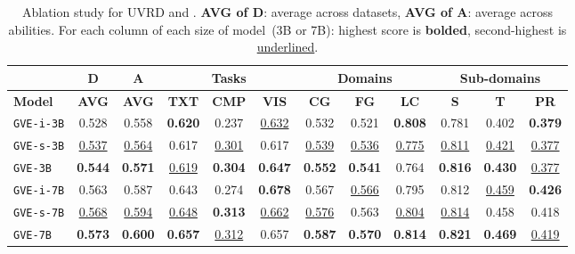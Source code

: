 \begin{table}[t]
\centering
\caption{Ablation study for UVRD and \pyramid. \colorbox{gray!15}{\textbf{AVG of D}}: average across datasets, \colorbox{gray!40}{\textbf{AVG of A}}: average across abilities. For each column of each size of model~(3B or 7B): highest score is \textbf{bolded}, second-highest is \underline{underlined}.}
\label{gve:tab:ablation}
\setlength{\tabcolsep}{2pt}
\begin{tabularx}{\linewidth}{X|>{\columncolor{gray!15}}c|>{\columncolor{gray!40}}c|ccc|ccc|ccc}
\toprule
& \textbf{D} & \textbf{A} & \multicolumn{3}{c|}{\textbf{Tasks}} & \multicolumn{3}{c|}{\textbf{Domains}} & \multicolumn{3}{c}{\textbf{Sub-domains}} \\
\midrule
\textbf{Model} & \textbf{AVG} & \textbf{AVG} & \textbf{TXT} & \textbf{CMP} & \textbf{VIS} & \textbf{CG} & \textbf{FG} & \textbf{LC} & \textbf{S} & \textbf{T} & \textbf{PR} \\
\midrule
\texttt{GVE-i-3B} & 0.528 & 0.558 & \textbf{0.620} & 0.237 & \underline{0.632} & 0.532 & 0.521 & \textbf{0.808} & 0.781 & 0.402 & \textbf{0.379} \\
\texttt{GVE-s-3B} & \underline{0.537} & \underline{0.564} & 0.617 & \underline{0.301} & 0.617 & \underline{0.539} & \underline{0.536} & \underline{0.775} & \underline{0.811} & \underline{0.421} & \underline{0.377} \\
\texttt{GVE-3B} & \textbf{0.544} & \textbf{0.571} & \underline{0.619} & \textbf{0.304} & \textbf{0.647} & \textbf{0.552} & \textbf{0.541} & 0.764 & \textbf{0.816} & \textbf{0.430} & \underline{0.377} \\
\midrule
\texttt{GVE-i-7B} & 0.563 & 0.587 & 0.643 & 0.274 & \textbf{0.678} & 0.567 & \underline{0.566} & 0.795 & 0.812 & \underline{0.459} & \textbf{0.426} \\
\texttt{GVE-s-7B} & \underline{0.568} & \underline{0.594} & \underline{0.648} & \textbf{0.313} & \underline{0.662} & \underline{0.576} & 0.563 & \underline{0.804} & \underline{0.814} & 0.458 & 0.418 \\
\texttt{GVE-7B} & \textbf{0.573} & \textbf{0.600} & \textbf{0.657} & \underline{0.312} & 0.657 & \textbf{0.587} & \textbf{0.570} & \textbf{0.814} & \textbf{0.821} & \textbf{0.469} & \underline{0.419} \\
\bottomrule
\end{tabularx}
\end{table}


